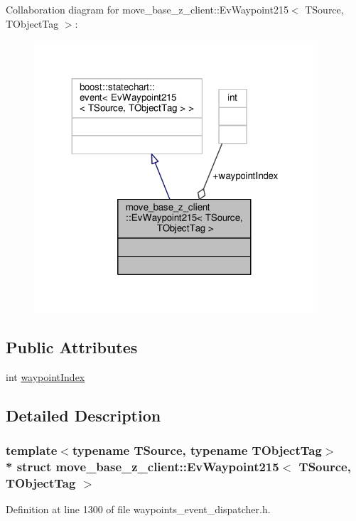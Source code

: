 Collaboration diagram for move\+\_\+base\+\_\+z\+\_\+client\+:\+:Ev\+Waypoint215$<$ T\+Source, T\+Object\+Tag $>$\+:\nopagebreak
\begin{figure}[H]
\begin{center}
\leavevmode
\includegraphics[width=299pt]{structmove__base__z__client_1_1EvWaypoint215__coll__graph}
\end{center}
\end{figure}
\subsection*{Public Attributes}
\begin{DoxyCompactItemize}
\item 
int \hyperlink{structmove__base__z__client_1_1EvWaypoint215_a95b7cdf797b976e591be2df2def9f696}{waypoint\+Index}
\end{DoxyCompactItemize}


\subsection{Detailed Description}
\subsubsection*{template$<$typename T\+Source, typename T\+Object\+Tag$>$\\*
struct move\+\_\+base\+\_\+z\+\_\+client\+::\+Ev\+Waypoint215$<$ T\+Source, T\+Object\+Tag $>$}



Definition at line 1300 of file waypoints\+\_\+event\+\_\+dispatcher.\+h.



